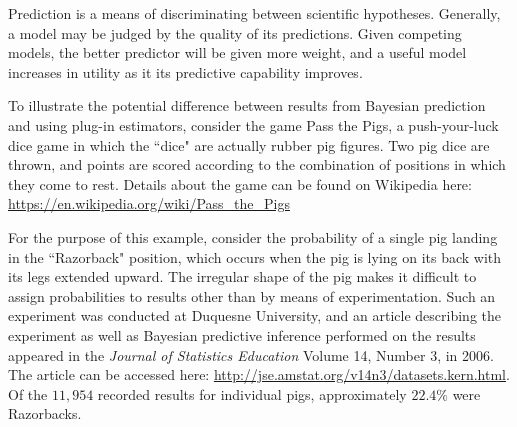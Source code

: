 \documentclass[12pt, a4paper]{article}
\begin{document}

    Prediction is a means of discriminating between scientific hypotheses.  Generally, a model may be judged by the quality of its predictions.  Given competing models, the better predictor will be given more weight, and a useful model increases in utility as it its predictive capability improves.





  To illustrate the potential difference between results from Bayesian prediction and using plug-in estimators, consider the game Pass the Pigs\texttrademark, a push-your-luck dice game in which the ``dice" are actually rubber pig figures.  Two pig dice are thrown, and points are scored according to the combination of positions in which they come to rest.  Details about the game can be found on Wikipedia here: \url{https://en.wikipedia.org/wiki/Pass_the_Pigs}

  For the purpose of this example, consider the probability of a single pig landing in the ``Razorback" position, which occurs when the pig is lying on its back with its legs extended upward.  The irregular shape of the pig makes it difficult to assign probabilities to results other than by means of experimentation.  Such an experiment was conducted at Duquesne University, and an article describing the experiment as well as Bayesian predictive inference performed on the results appeared in the \textit{Journal of Statistics Education} Volume 14, Number 3, in 2006.  The article can be accessed here:  \url{http://jse.amstat.org/v14n3/datasets.kern.html}. Of the $11,954$ recorded results for individual pigs, approximately $22.4\%$ were Razorbacks.
\end{document}
